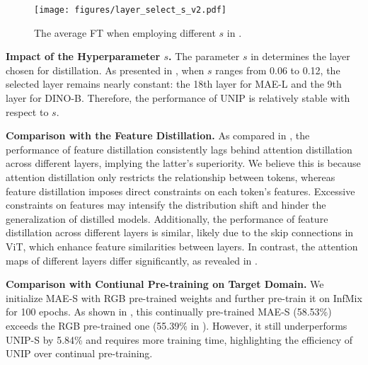 \begin{wrapfigure}{r}{0.25\textwidth}
\vspace{-11pt}
\centering
\texttt{[image: figures/layer\_select\_s\_v2.pdf]}
\vspace{-22pt}
\caption{The average FT when employing different $s$ in .}
\label{fig:para_s}
\vspace{-15pt}
\end{wrapfigure}
\textbf{Impact of the Hyperparameter $s$.} The parameter $s$ in  determines the layer chosen for distillation. As presented in , when $s$ ranges from 0.06 to 0.12, the selected layer remains nearly constant: the 18th layer for MAE-L and the 9th layer for DINO-B. Therefore, the performance of UNIP is relatively stable with respect to $s$.


\textbf{Comparison with the Feature Distillation.} As compared in , the performance of feature distillation consistently lags behind attention distillation across different layers, implying the latter's superiority. We believe this is because attention distillation only restricts the relationship between tokens, whereas feature distillation imposes direct constraints on each token's features. Excessive constraints on features may intensify the distribution shift and hinder the generalization of distilled models. Additionally, the performance of feature distillation across different layers is similar, likely due to the skip connections in ViT, which enhance feature similarities between layers. In contrast, the attention maps of different layers differ significantly, as revealed in .


\begin{wraptable}{r}{0.48\textwidth}
    \vspace{-7.5mm}
    \centering
    \caption{Comparisons of pre-training methods.}
    \label{tab:other_methods}
    \scriptsize
    \vspace{-4mm}
\end{wraptable}
\textbf{Comparison with Contiunal Pre-training on Target Domain.}
We initialize MAE-S with RGB pre-trained weights and further pre-train it on InfMix for 100 epochs. As shown in , this continually pre-trained MAE-S (58.53\%) exceeds the RGB pre-trained one (55.39\% in ). However, it still underperforms UNIP-S by 5.84\% and requires more training time, highlighting the efficiency of UNIP over continual pre-training.

